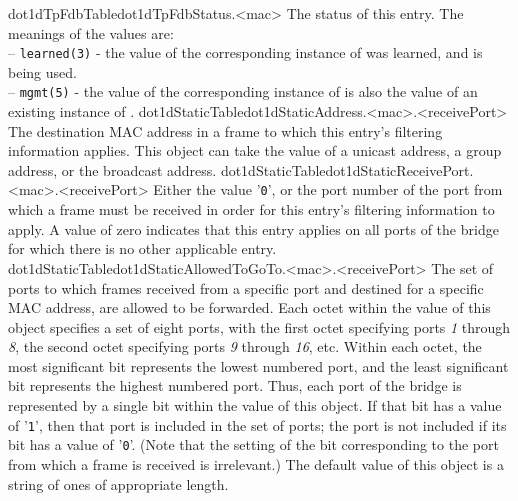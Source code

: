  {dot1dTpFdbTable}{dot1dTpFdbStatus.<mac>}{
	    The status of this entry.  The meanings of the
	    values are:\\
		-- \texttt{learned(3)} - the value of the corresponding instance
		of \texttt{}
		was learned, and is being used.\\
		-- \texttt{mgmt(5)} - the value of the corresponding instance of
		\texttt{}
		is also the value of an existing instance of
		\texttt{}.}
  {dot1dStaticTable}{dot1dStaticAddress.<mac>.<receivePort>}{
	    The destination MAC address in a frame to which this
	    entry's filtering information applies.  This object can
	    take the value of a unicast address, a group address, or
	    the broadcast address.}
  {dot1dStaticTable}{dot1dStaticReceivePort.<mac>.<receivePort>}{
	    Either the value '\texttt{0}', or the port number of the port
	    from which a frame must be received in order for this
	    entry's filtering information to apply.  A value of zero
	    indicates that this entry applies on all ports of the
	    bridge for which there is no other applicable entry.}
  {dot1dStaticTable}{dot1dStaticAllowedToGoTo.<mac>.<receivePort>}{
	    The set of ports to which frames received from a
	    specific port and destined for a specific MAC address,
	    are allowed to be forwarded.  Each octet within the
	    value of this object specifies a set of eight ports,
	    with the first octet specifying ports \textit{1} through \textit{8}, the
	    second octet specifying ports \textit{9} through \textit{16}, etc.  Within
	    each octet, the most significant bit represents the
	    lowest numbered port, and the least significant bit
	    represents the highest numbered port.  Thus, each port
	    of the bridge is represented by a single bit within the
	    value of this object.  If that bit has a value of '\texttt{1}',
	    then that port is included in the set of ports; the port
	    is not included if its bit has a value of '\texttt{0}'.  (Note
	    that the setting of the bit corresponding to the port
	    from which a frame is received is irrelevant.)  The
	    default value of this object is a string of ones of
	    appropriate length.}
